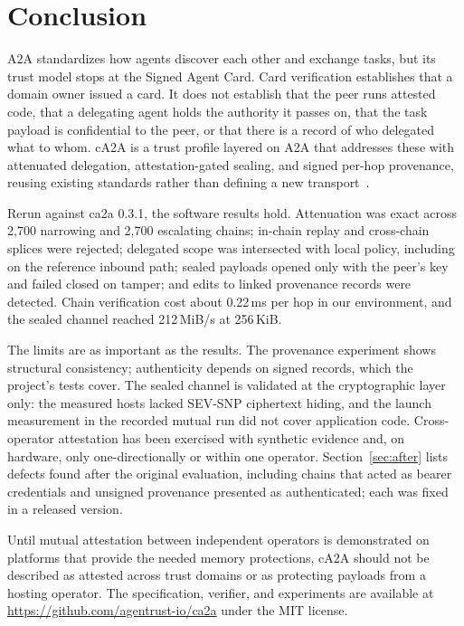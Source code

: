 \section{Conclusion}\label{sec:conclusion}

A2A standardizes how agents discover each other and exchange tasks, but its trust model stops at
the Signed Agent Card. Card verification establishes that a domain owner issued a card. It does
not establish that the peer runs attested code, that a delegating agent holds the authority it
passes on, that the task payload is confidential to the peer, or that there is a record of who
delegated what to whom. cA2A is a trust profile layered on A2A that addresses these with
attenuated delegation, attestation-gated sealing, and signed per-hop provenance, reusing existing
standards rather than defining a new transport~\citep{a2a2026,trace2025}.

Rerun against ca2a 0.3.1, the software results hold. Attenuation was exact across 2,700
narrowing and 2,700 escalating chains; in-chain replay and cross-chain splices were rejected;
delegated scope was intersected with local policy, including on the reference inbound path;
sealed payloads opened only with the peer's key and failed closed on tamper; and edits to linked
provenance records were detected. Chain verification cost about 0.22\,ms per hop in our
environment, and the sealed channel reached 212\,MiB/s at 256\,KiB.

The limits are as important as the results. The provenance experiment shows structural
consistency; authenticity depends on signed records, which the project's tests cover. The sealed
channel is validated at the cryptographic layer only: the measured hosts lacked SEV-SNP ciphertext
hiding, and the launch measurement in the recorded mutual run did not cover application code.
Cross-operator attestation has been exercised with synthetic evidence and, on hardware, only
one-directionally or within one operator. Section~\ref{sec:after} lists defects found after the
original evaluation, including chains that acted as bearer credentials and unsigned provenance
presented as authenticated; each was fixed in a released version.

Until mutual attestation between independent operators is demonstrated on platforms that provide
the needed memory protections, cA2A should not be described as attested across trust domains or as
protecting payloads from a hosting operator. The specification, verifier, and experiments are
available at \url{https://github.com/agentrust-io/ca2a} under the MIT license.
